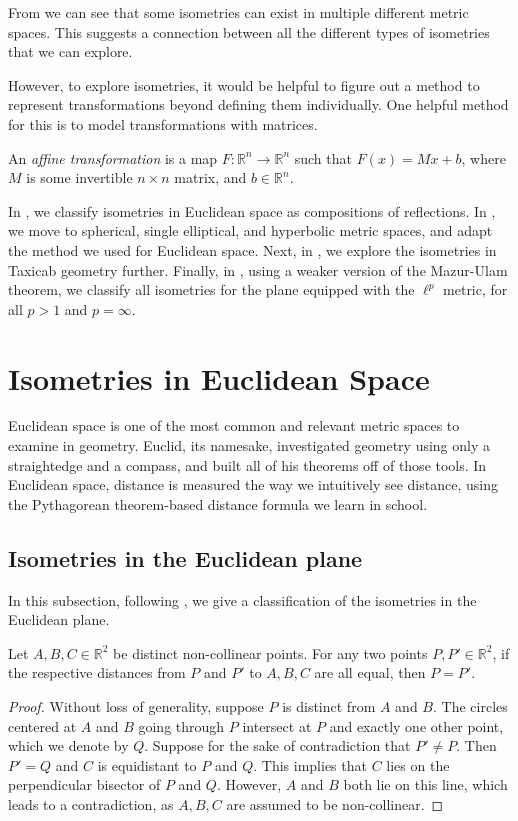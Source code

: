 \documentclass{mystyle}
\begin{document}
From  we can see that some isometries can exist in multiple different metric spaces. This suggests a connection between all the different types of isometries that we can explore.

However, to explore isometries, it would be helpful to figure out a method to represent transformations beyond defining them individually. One helpful method for this is to model transformations with matrices.

\begin{definition}
    An \textit{affine transformation} is a map $F: \mathbb{R}^n \to \mathbb{R}^n$ such that $F(x) = Mx + b$, where $M$ is some invertible $n \times n$ matrix, and $b \in \mathbb{R}^n$. 
\end{definition}

In , we classify isometries in Euclidean space as compositions of reflections. In , we move to spherical, single elliptical, and hyperbolic metric spaces, and adapt the method we used for Euclidean space. Next, in , we explore the isometries in Taxicab geometry further. Finally, in , using a weaker version of the Mazur-Ulam theorem, we classify all isometries for the plane equipped with the $\ell^p$ metric, for all $p > 1$ and $p = \infty$.

\section{Isometries in Euclidean Space}\label{sec_two}
Euclidean space is one of the most common and relevant metric spaces to examine in geometry. Euclid, its namesake, investigated geometry using only a straightedge and a compass, and built all of his theorems off of those tools. In Euclidean space, distance is measured the way we intuitively see distance, using the Pythagorean theorem-based distance formula we learn in school.

\subsection{Isometries in the Euclidean plane}
In this subsection, following \cite{sibley2015}, we give a classification of the isometries in the Euclidean plane.

\begin{lemma}\label{lem_three_points}
    Let $A, B, C \in \mathbb{R}^2$ be distinct non-collinear points. For any two points $P, P' \in \mathbb{R}^2$, if the respective distances from $P$ and $P'$ to $A, B, C$ are all equal, then $P = P'$.
\end{lemma}
\begin{proof}
Without loss of generality, suppose $P$ is distinct from $A$ and $B$. The circles centered at $A$ and $B$ going through $P$ intersect at $P$ and exactly one other point, which we denote by $Q$. Suppose for the sake of contradiction that $P' \neq P$. Then $P' = Q$ and $C$ is equidistant to $P$ and $Q$. This implies that $C$ lies on the perpendicular bisector of $P$ and $Q$. However, $A$ and $B$ both lie on this line, which leads to a contradiction, as $A, B, C$ are assumed to be non-collinear.
\end{proof}
\end{document}
